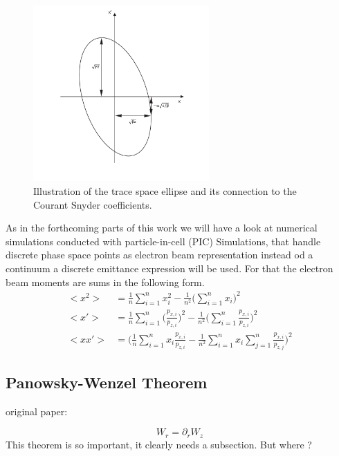 \begin{figure}[htbp]
\begin{center}
\includegraphics[width=0.6\textwidth]{theory/images/edited/TraceSpaceCourantSnyder.pdf}
\end{center}
\caption{Illustration of the trace space ellipse and its connection to the Courant Snyder coefficients.}
\label{img:TraceSpace}
\end{figure}
As in the forthcoming parts of this work we will have a look at numerical simulations conducted with particle-in-cell (PIC) Simulations, that handle discrete phase space points as electron beam representation instead od a continuum a discrete emittance expression will be used. For that the electron beam moments are sums in the following form.
\begin{align}
<x^2>&=\frac{1}{n} \sum_{i=1}^{n} x_i^2-\frac{1}{n^2}\Big(\sum_{i=1}^{n} x_i\Big)^2\\
<x'>&=\frac{1}{n} \sum_{i=1}^{n}\Big(\frac{p_{x,i}}{p_{z,i}}\Big)^2-\frac{1}{n^2}\Big(\sum_{i=1}^{n}\frac{p_{x,i}}{p_{z,i}}\Big)^2\\
<xx'>&=\Big(\frac{1}{n}\sum_{i=1}^{n}x_i\frac{p_{x,i}}{p_{z,i}}-\frac{1}{n^2}\sum_{i=1}^{n}x_i \sum_{j=1}^{n}\frac{p_{x,i}}{p_{z,j}}\Big)^2
\end{align}


\subsection{Panowsky-Wenzel Theorem}

original paper:  \cite{Panowsky_Wenzel_original}

 \begin{equation}
W_r =\partial_r W_z
\end{equation} 
This theorem is so important, it clearly needs a subsection. But where ?


